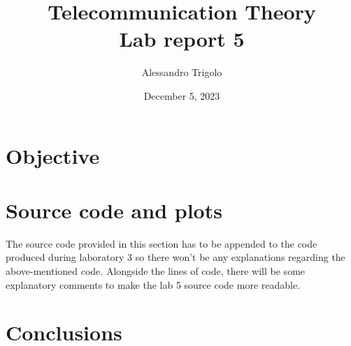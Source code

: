 \title{\vspace{160px} \textbf{\huge{Telecommunication Theory}} \\\vspace{17.5px} \LARGE{Lab report 5}  \vspace{10px}}
\author{Alessandro Trigolo}
\date{December 5, 2023}


\maketitle \newpage

\section*{Objective}


\lstset{style = MATLAB}
\section*{Source code and plots}
The source code provided in this section has to be appended to the code produced during laboratory 3 so there won't be any explanations regarding the above-mentioned code. Alongside the lines of code, there will be some explanatory comments to make the lab 5 source code more readable.



\section*{Conclusions}






